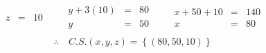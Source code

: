 \documentclass[10pt, a4paper]{article}
\begin{document}
  \begin{align*}
    \begin{array}{ccc}
      \begin{array}{rcl}
        z &=& 10
      \end{array}
      & \quad
      \begin{array}{rcl}
        y + 3(10) &=& 80\\
        y &=& 50
      \end{array}
      & \quad
      \begin{array}{rcl}
        x + 50 + 10 &=& 140\\
        x &=& 80
      \end{array}
    \end{array}
  \end{align*}
  \begin{align*}
    \therefore \ &C.S. \left(x,y,z\right) = \left\{\left(80,50,10\right)\right\}
  \end{align*}
  \begin{center}
  \end{center}
\newpage
\end{document}
